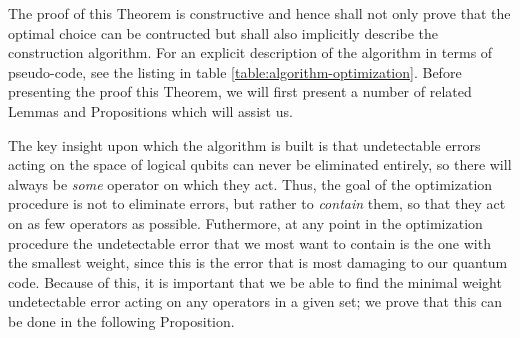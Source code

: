 \documentclass[twocolumn,showpacs,preprintnumbers,amsmath,amssymb,nofootinbib,pra,floatfix]{revtex4-1}
\newenvironment{remark}[1][Remark]{\begin{trivlist}
\item[\hskip \labelsep {\bfseries #1}]}{\end{trivlist}}
\begin{document}
\begin{remark}
The proof of this Theorem is constructive and hence shall not only prove that the optimal choice can be contructed but shall also implicitly describe the construction algorithm.  For an explicit description of the algorithm in terms of pseudo-code, see the listing in table \ref{table:algorithm-optimization}.  Before presenting the proof this Theorem, we will first present a number of related Lemmas and Propositions which will assist us.

The key insight upon which the algorithm is built is that undetectable errors acting on the space of logical qubits can never be eliminated entirely, so there will always be \emph{some} operator on which they act.  Thus, the goal of the optimization procedure is not to eliminate errors, but rather to \emph{contain} them, so that they act on as few operators as possible.  Futhermore, at any point in the optimization procedure the undetectable error that we most want to contain is the one with the smallest weight, since this is the error that is most damaging to our quantum code.  Because of this, it is important that we be able to find the minimal weight undetectable error acting on any operators in a given set;  we prove that this can be done in the following Proposition.
\end{remark}
\end{document}
